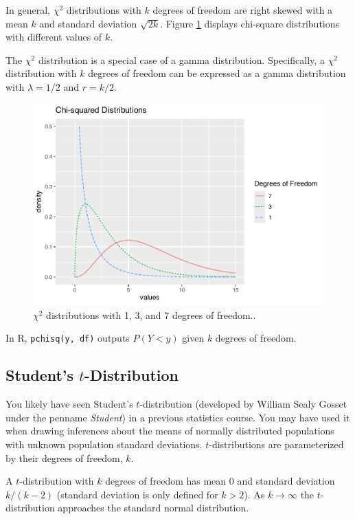 \documentclass[
]{krantz}
\begin{document}
In general, \(\chi^2\) distributions with \(k\) degrees of freedom are right skewed with a mean \(k\) and standard deviation \(\sqrt{2k}\). Figure \ref{fig:multChisq} displays chi-square distributions with different values of \(k\).

The \(\chi^2\) distribution is a special case of a gamma distribution. Specifically, a \(\chi^2\) distribution with \(k\) degrees of freedom can be expressed as a gamma distribution with \(\lambda = 1/2\) and \(r = k/2\).



\begin{figure}

{\centering \includegraphics[width=0.6\linewidth]{bookdown-BeyondMLR_files/figure-latex/multChisq-1} 

}

\caption{\(\chi^2\) distributions with 1, 3, and 7 degrees of freedom..}\label{fig:multChisq}
\end{figure}

In R, \texttt{pchisq(y,\ df)} outputs \(P(Y < y)\) given \(k\) degrees of freedom.

\subsection{\texorpdfstring{Student's \(t\)-Distribution}{Student's t-Distribution}}\label{students-t-distribution}

You likely have seen Student's \(t\)-distribution  (developed by William Sealy Gosset under the penname \emph{Student}) in a previous statistics course. You may have used it when drawing inferences about the means of normally distributed populations with unknown population standard deviations. \(t\)-distributions are parameterized by their degrees of freedom, \(k\).

A \(t\)-distribution with \(k\) degrees of freedom has mean \(0\) and standard deviation \(k/(k-2)\) (standard deviation is only defined for \(k > 2\)). As \(k \rightarrow \infty\) the \(t\)-distribution approaches the standard normal distribution.
\end{document}
